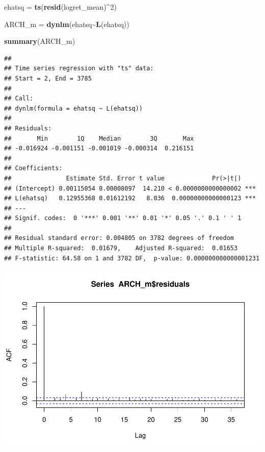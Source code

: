 \documentclass[
]{book}
\newenvironment{Shaded}{\begin{snugshade}}{\end{snugshade}}
\newcommand{\DecValTok}[1]{\textcolor[rgb]{0.00,0.00,0.81}{#1}}
\newcommand{\FunctionTok}[1]{\textcolor[rgb]{0.13,0.29,0.53}{\textbf{#1}}}
\newcommand{\NormalTok}[1]{#1}
\newcommand{\OtherTok}[1]{\textcolor[rgb]{0.56,0.35,0.01}{#1}}
\newcommand{\SpecialCharTok}[1]{\textcolor[rgb]{0.81,0.36,0.00}{\textbf{#1}}}
\begin{document}
\begin{Shaded}
\begin{Highlighting}[]
\NormalTok{ehatsq }\OtherTok{=} \FunctionTok{ts}\NormalTok{(}\FunctionTok{resid}\NormalTok{(logret\_mean)}\SpecialCharTok{\^{}}\DecValTok{2}\NormalTok{)}

\NormalTok{ARCH\_m }\OtherTok{=} \FunctionTok{dynlm}\NormalTok{(ehatsq}\SpecialCharTok{\textasciitilde{}}\FunctionTok{L}\NormalTok{(ehatsq))}

\FunctionTok{summary}\NormalTok{(ARCH\_m)}
\end{Highlighting}
\end{Shaded}

\begin{verbatim}
## 
## Time series regression with "ts" data:
## Start = 2, End = 3785
## 
## Call:
## dynlm(formula = ehatsq ~ L(ehatsq))
## 
## Residuals:
##       Min        1Q    Median        3Q       Max 
## -0.016924 -0.001151 -0.001019 -0.000314  0.216151 
## 
## Coefficients:
##               Estimate Std. Error t value             Pr(>|t|)    
## (Intercept) 0.00115054 0.00008097  14.210 < 0.0000000000000002 ***
## L(ehatsq)   0.12955368 0.01612192   8.036  0.00000000000000123 ***
## ---
## Signif. codes:  0 '***' 0.001 '**' 0.01 '*' 0.05 '.' 0.1 ' ' 1
## 
## Residual standard error: 0.004805 on 3782 degrees of freedom
## Multiple R-squared:  0.01679,    Adjusted R-squared:  0.01653 
## F-statistic: 64.58 on 1 and 3782 DF,  p-value: 0.000000000000001231
\end{verbatim}

\begin{Shaded}
\end{Shaded}

\includegraphics{Notas-Series-Tiempo_files/figure-latex/ArchTest-1.pdf}
\end{document}
